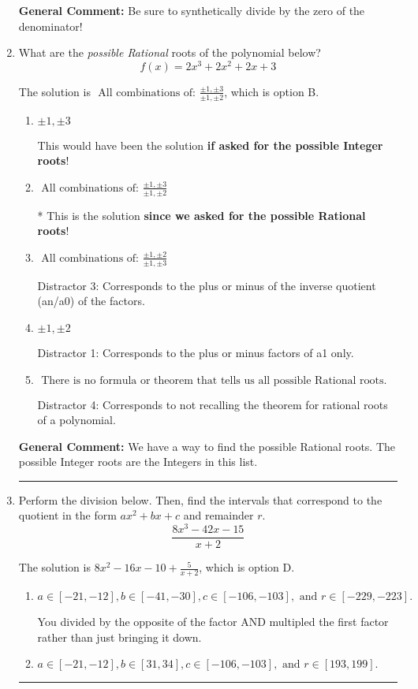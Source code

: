\documentclass{extbook}[14pt]
\newcommand{\litem}[1]{\item #1

\rule{\textwidth}{0.4pt}}
\begin{document}
\begin{enumerate}
{\textbf{General Comment:} Be sure to synthetically divide by the zero of the denominator!
}
\litem{
What are the \textit{possible Rational} roots of the polynomial below?
\[ f(x) = 2x^{3} +2 x^{2} +2 x + 3 \]

The solution is \( \text{ All combinations of: }\frac{\pm 1,\pm 3}{\pm 1,\pm 2} \), which is option B.\begin{enumerate}[label=\Alph*.]
\item \( \pm 1,\pm 3 \)

This would have been the solution \textbf{if asked for the possible Integer roots}!
\item \( \text{ All combinations of: }\frac{\pm 1,\pm 3}{\pm 1,\pm 2} \)

* This is the solution \textbf{since we asked for the possible Rational roots}!
\item \( \text{ All combinations of: }\frac{\pm 1,\pm 2}{\pm 1,\pm 3} \)

 Distractor 3: Corresponds to the plus or minus of the inverse quotient (an/a0) of the factors. 
\item \( \pm 1,\pm 2 \)

 Distractor 1: Corresponds to the plus or minus factors of a1 only.
\item \( \text{ There is no formula or theorem that tells us all possible Rational roots.} \)

 Distractor 4: Corresponds to not recalling the theorem for rational roots of a polynomial.
\end{enumerate}

\textbf{General Comment:} We have a way to find the possible Rational roots. The possible Integer roots are the Integers in this list.
}
\litem{
Perform the division below. Then, find the intervals that correspond to the quotient in the form $ax^2+bx+c$ and remainder $r$.
\[ \frac{8x^{3} -42 x -15}{x + 2} \]

The solution is \( 8x^{2} -16 x -10 + \frac{5}{x + 2} \), which is option D.\begin{enumerate}[label=\Alph*.]
\item \( a \in [-21, -12], b \in [-41, -30], c \in [-106, -103], \text{ and } r \in [-229, -223]. \)

 You divided by the opposite of the factor AND multipled the first factor rather than just bringing it down.
\item \( a \in [-21, -12], b \in [31, 34], c \in [-106, -103], \text{ and } r \in [193, 199]. \)


\end{enumerate}}
\end{enumerate}
\end{document}
